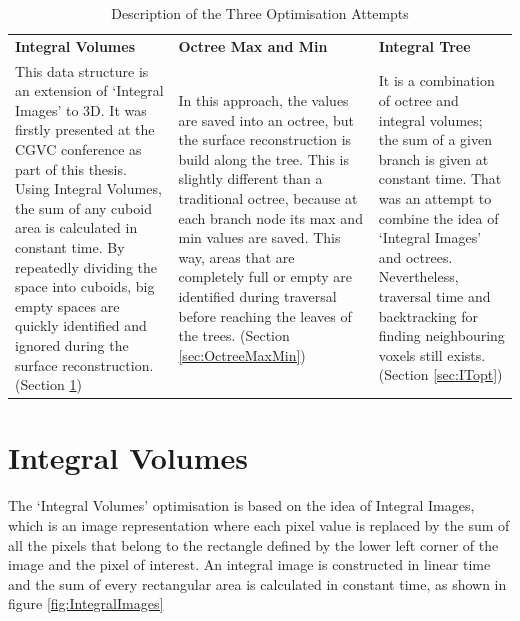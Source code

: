 \documentclass{subfiles}
\begin{document}
\begin{table}[!htbp]
	\renewcommand{\arraystretch}{1.3}
	
	\centering
	\begin{tabular}{|P{0.3\textwidth}|P{0.3\textwidth}|P{0.3\textwidth}|}	
		\hline
		\textbf{Integral Volumes} &	\textbf{Octree Max and Min} & \textbf{Integral Tree}  \\
		\hlinewd{1.5pt}
		This data structure is an extension of `Integral Images' to 3D. It was firstly presented at the CGVC conference as part of this thesis. Using Integral Volumes, the sum of any cuboid area is calculated in constant time. By repeatedly dividing the space into cuboids, big empty spaces are quickly identified and ignored during the surface reconstruction. \newline(Section \ref{sec:IVopt}) &	In this approach, the values are saved into an octree, but the surface reconstruction is build along the tree. This is slightly different than a traditional octree, because at each branch node its max and min values are saved. This way, areas that are completely full or empty are identified during traversal before reaching the leaves of the trees. (Section \ref{sec:OctreeMaxMin})  & It is a combination of octree and integral volumes; the sum of a given branch is given at constant time. That was an attempt to combine the idea of `Integral Images' and octrees. Nevertheless, traversal time and backtracking for finding neighbouring voxels still exists. (Section \ref{sec:ITopt})\\	
		\hline
	\end{tabular}
	\caption{Description of the Three Optimisation Attempts}
	\label{tab:DataStructuresOptimised}
\end{table}

\newpage

\section{Integral Volumes}\label{sec:IVopt}
The `Integral Volumes' optimisation is based on the idea of Integral Images, which is an image representation where each pixel value is replaced by the sum of all the pixels that belong to the rectangle defined by the lower left corner of the image and the pixel of interest.  An integral image is constructed in linear time and the sum of every rectangular area is calculated in constant time, as shown in figure \ref{fig:IntegralImages} \cite{Crow1984}
\end{document}

